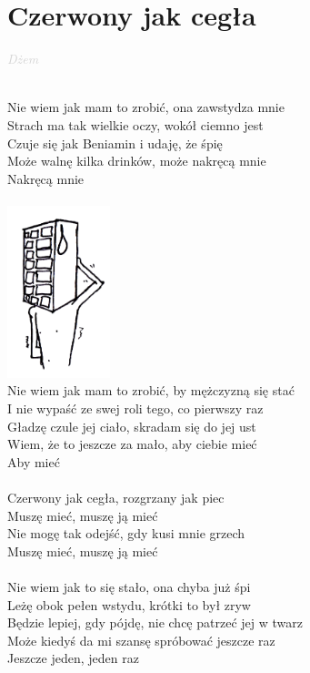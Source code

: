 \documentclass[a5paper, 10pt]{book}
\begin{document}
\section{Czerwony jak cegła}\textcolor{lightgray}{\textit{Dżem}}\\~\\
\begin{minipage}[t]{0.8\textwidth}
  Nie wiem jak mam to zrobić, ona zawstydza mnie\\
  Strach ma tak wielkie oczy, wokół ciemno jest\\
  Czuje się jak Beniamin i udaję, że śpię\\
  Może walnę kilka drinków, może nakręcą mnie\\
  Nakręcą mnie\\
  \\
  \includegraphics[height=5cm,right]{images/czerwony_jak_cegla.png}\vspace*{-51mm}\\
  Nie wiem jak mam to zrobić, by mężczyzną się stać\\
  I nie wypaść ze swej roli tego, co pierwszy raz\\
  Gładzę czule jej ciało, skradam się do jej ust\\
  Wiem, że to jeszcze za mało, aby ciebie mieć\\
  Aby mieć\\
  \\
  \hspace*{5mm}Czerwony jak cegła, rozgrzany jak piec\\
  \hspace*{5mm}Muszę mieć, muszę ją mieć\\
  \hspace*{5mm}Nie mogę tak odejść, gdy kusi mnie grzech\\
  \hspace*{5mm}Muszę mieć, muszę ją mieć\\
  \\
  Nie wiem jak to się stało, ona chyba już śpi\\
  Leżę obok pełen wstydu, krótki to był zryw\\
  Będzie lepiej, gdy pójdę, nie chcę patrzeć jej w twarz\\
  Może kiedyś da mi szansę spróbować jeszcze raz\\
  Jeszcze jeden, jeden raz\\
\end{minipage}
\end{document}
